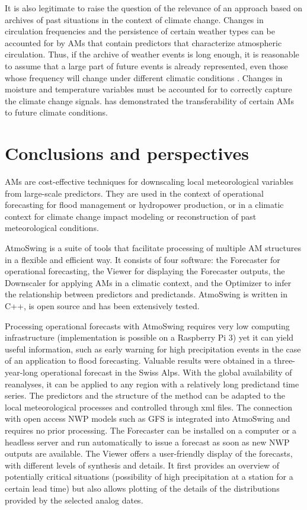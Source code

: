 \documentclass[review]{elsarticle}
\begin{document}
It is also legitimate to raise the question of the relevance of an approach based on archives of past situations in the context of climate change. Changes in circulation frequencies and the persistence of certain weather types \citep{Hewitson1996} can be accounted for by AMs that contain predictors that characterize atmospheric circulation. Thus, if the archive of weather events is long enough, it is reasonable to assume that a large part of future events is already represented, even those whose frequency will change under different climatic conditions \citep{Wetterhall2005}. Changes in moisture and temperature variables must be accounted for to correctly capture the climate change signals. \citet{Dayon2015} has demonstrated the transferability of certain AMs to future climate conditions.


\section{Conclusions and perspectives}
\label{sec:conclusions}

AMs are cost-effective techniques for downscaling local meteorological variables from large-scale predictors. They are used in the context of operational forecasting for flood management or hydropower production, or in a climatic context for climate change impact modeling or reconstruction of past meteorological conditions. 

AtmoSwing is a suite of tools that facilitate processing of multiple AM structures in a flexible and efficient way. It consists of four software: the Forecaster for operational forecasting, the Viewer for displaying the Forecaster outputs, the Downscaler for applying AMs in a climatic context, and the Optimizer to infer the relationship between predictors and predictands. AtmoSwing is written in C++, is open source and has been extensively tested.

Processing operational forecasts with AtmoSwing requires very low computing infrastructure (implementation is possible on a Raspberry Pi 3) yet it can yield useful information, such as early warning for high precipitation events in the case of an application to flood forecasting. Valuable results were obtained in a three-year-long operational forecast in the Swiss Alps. With the global availability of reanalyses, it can be applied to any region with a relatively long predictand time series. The predictors and the structure of the method can be adapted to the local meteorological processes and controlled through xml files. The connection with open access NWP models such as GFS is integrated into AtmoSwing and requires no prior processing. The Forecaster can be installed on a computer or a headless server and run automatically to issue a forecast as soon as new NWP outputs are available. The Viewer offers a user-friendly display of the forecasts, with different levels of synthesis and details. It first provides an overview of potentially critical situations (possibility of high precipitation at a station for a certain lead time) but also allows plotting of the details of the distributions provided by the selected analog dates.
\end{document}
